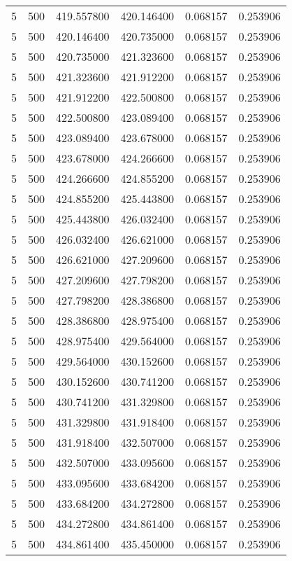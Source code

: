 \begin{longtable}{rrrrrr}
5 & 500 & 419.557800 & 420.146400 & 0.068157 & 0.253906 \\
5 & 500 & 420.146400 & 420.735000 & 0.068157 & 0.253906 \\
5 & 500 & 420.735000 & 421.323600 & 0.068157 & 0.253906 \\
5 & 500 & 421.323600 & 421.912200 & 0.068157 & 0.253906 \\
5 & 500 & 421.912200 & 422.500800 & 0.068157 & 0.253906 \\
5 & 500 & 422.500800 & 423.089400 & 0.068157 & 0.253906 \\
5 & 500 & 423.089400 & 423.678000 & 0.068157 & 0.253906 \\
5 & 500 & 423.678000 & 424.266600 & 0.068157 & 0.253906 \\
5 & 500 & 424.266600 & 424.855200 & 0.068157 & 0.253906 \\
5 & 500 & 424.855200 & 425.443800 & 0.068157 & 0.253906 \\
5 & 500 & 425.443800 & 426.032400 & 0.068157 & 0.253906 \\
5 & 500 & 426.032400 & 426.621000 & 0.068157 & 0.253906 \\
5 & 500 & 426.621000 & 427.209600 & 0.068157 & 0.253906 \\
5 & 500 & 427.209600 & 427.798200 & 0.068157 & 0.253906 \\
5 & 500 & 427.798200 & 428.386800 & 0.068157 & 0.253906 \\
5 & 500 & 428.386800 & 428.975400 & 0.068157 & 0.253906 \\
5 & 500 & 428.975400 & 429.564000 & 0.068157 & 0.253906 \\
5 & 500 & 429.564000 & 430.152600 & 0.068157 & 0.253906 \\
5 & 500 & 430.152600 & 430.741200 & 0.068157 & 0.253906 \\
5 & 500 & 430.741200 & 431.329800 & 0.068157 & 0.253906 \\
5 & 500 & 431.329800 & 431.918400 & 0.068157 & 0.253906 \\
5 & 500 & 431.918400 & 432.507000 & 0.068157 & 0.253906 \\
5 & 500 & 432.507000 & 433.095600 & 0.068157 & 0.253906 \\
5 & 500 & 433.095600 & 433.684200 & 0.068157 & 0.253906 \\
5 & 500 & 433.684200 & 434.272800 & 0.068157 & 0.253906 \\
5 & 500 & 434.272800 & 434.861400 & 0.068157 & 0.253906 \\
5 & 500 & 434.861400 & 435.450000 & 0.068157 & 0.253906 \\

\end{longtable}
